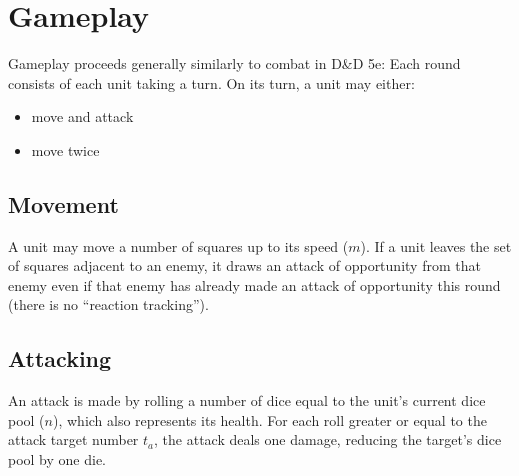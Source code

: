 \section{Gameplay}

Gameplay proceeds generally similarly to combat in D\&D 5e:
Each round consists of each unit taking a turn.
On its turn,
a unit may either:
\begin{itemize}
    \item move and attack
    \item move twice
\end{itemize}

\subsection{Movement}
A unit may move a number of squares up to its speed ($m$).
If a unit leaves the set of squares adjacent to an enemy,
it draws an attack of opportunity from that enemy
even if that enemy has already made an attack of opportunity this round
(there is no ``reaction tracking'').

\subsection{Attacking}
An attack is made by rolling a number of dice equal to the unit's current dice pool ($n$),
which also represents its health.
For each roll greater or equal to the attack target number $t_a$,
the attack deals one damage,
reducing the target's dice pool by one die.


